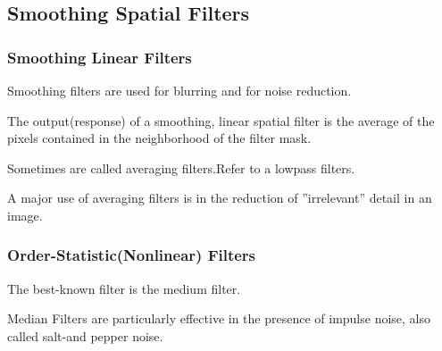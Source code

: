 \documentclass[notheorems, serif, table, compress]{beamer}  %
\begin{document}
\subsection{Smoothing Spatial Filters}%
\begin{frame}
\frametitle{Smoothing Linear Filters}%

Smoothing filters are used for blurring and for noise reduction.

The output(response) of a smoothing, linear spatial filter  is  the average of the pixels contained in the neighborhood of the filter mask.
 
Sometimes are called averaging filters.Refer to a lowpass filters.

A major use of averaging filters is in the reduction of ”irrelevant” detail in an image.
 \end{frame}



\begin{frame}
\frametitle{Order-Statistic(Nonlinear) Filters}%
 The best-known filter is the medium filter.
 
Median Filters are particularly effective in the presence of impulse noise, also called salt-and pepper noise.

 \end{frame}
\end{document}
